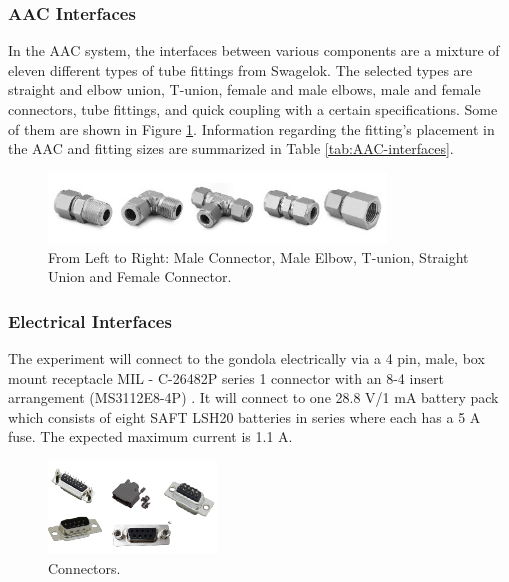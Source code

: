 

\subsubsection{AAC Interfaces}
In the AAC system, the interfaces between various components are a mixture of eleven different types of tube fittings from Swagelok. The selected types are straight and elbow union, T-union, female and male elbows, male and female connectors, tube fittings, and quick coupling with a certain  specifications. Some of them are shown in Figure \ref{fig:AAC-interfaces-fittings}. Information regarding the fitting's placement in the AAC and fitting sizes are summarized in Table \ref{tab:AAC-interfaces}. 

\begin{figure}[H]
    \centering
    \includegraphics[width=0.8\textwidth]{4-experiment-design/img/Mechanical/AAC-interfaces.jpg}
    \caption{From Left to Right: Male Connector, Male Elbow, T-union, Straight Union and Female Connector.}
    \label{fig:AAC-interfaces-fittings}
\end{figure}




\subsubsection{Electrical Interfaces}
\label{sec:4.2.3}

The experiment will connect to the gondola electrically via a 4 pin, male, box mount receptacle MIL - C-26482P series 1 connector with an 8-4 insert arrangement (MS3112E8-4P) \cite{BexusManual}. It will connect to one 28.8 V/1 mA battery pack which consists of eight SAFT LSH20 batteries in series where each has a 5 A fuse\cite{BexusManual}. The expected maximum current is 1.1 A.

\begin{figure}[H]
    \centering
    \includegraphics[width=0.4\textwidth]{4-experiment-design/img/connectors.png}
    \caption{Connectors.}
    \label{fig:connectors}
\end{figure}

